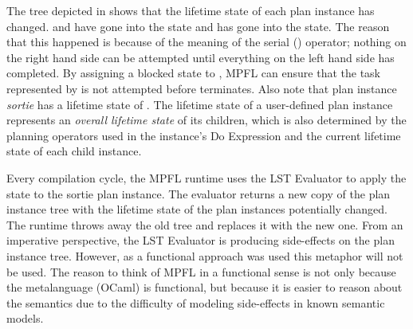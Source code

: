 The tree depicted in  shows that the lifetime state of each plan instance has changed.  and  have gone into the  state and  has gone into the  state. The reason that this happened is because of the meaning of the serial (\Code{$>$}) operator; nothing on the right hand side can be attempted until everything on the left hand side has completed. By assigning a blocked state to , MPFL can ensure that the task represented by  is not attempted before  terminates. Also note that plan instance \emph{sortie} has a lifetime state of . The lifetime state of a user-defined plan instance represents an \emph{overall lifetime state} of its children, which is also determined by the planning operators used in the instance's Do Expression and the current lifetime state of each child instance.

Every compilation cycle, the MPFL runtime uses the LST Evaluator to apply the  state to the sortie plan instance. The evaluator returns a new copy of the plan instance tree with the lifetime state of the plan instances potentially changed. The runtime throws away the old tree and replaces it with the new one. From an imperative perspective, the LST Evaluator is producing side-effects on the plan instance tree. However, as a functional approach was used this metaphor will not be used. The reason to think of MPFL in a functional sense is not only because the metalanguage (OCaml) is functional, but because it is easier to reason about the semantics due to the difficulty of modeling side-effects in known semantic models.

